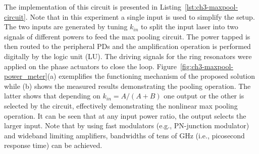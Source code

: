 The implementation of this circuit is presented in Listing~\ref{lst:ch3-maxpool-circuit}.
Note that in this experiment a single input is used to simplify the setup.
The two inputs are generated by tuning \(k_{in}\) to split the input laser into two signals of different powers to feed the max pooling circuit.
The power tapped is then routed to the peripheral PDs and the amplification operation is performed digitally by the logic unit (LU).
The driving signals for the ring resonators were applied on the phase actuators to close the loop.
Figure~\ref{fig:ch3-maxpool-power_meter}(a) exemplifies the functioning mechanism of the proposed solution while (b) shows the measured results demonstrating the pooling operation.
The latter shows that depending on \(k_{in}=A/(A+B)\) one output or the other is selected by the circuit, effectively demonstrating the nonlinear max pooling operation.
It can be seen that at any input power ratio, the output selects the larger input.
Note that by using fast modulators (e.g., PN-junction modulator) and wideband limiting amplifiers, bandwidths of tens of GHz (i.e., picosecond response time) can be achieved.


